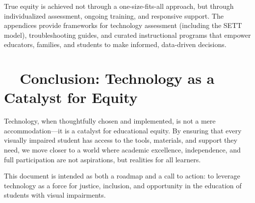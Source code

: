 True equity is achieved not through a one-size-fits-all approach, but through individualized assessment, ongoing training, and responsive support.\supercite{Presley2012, WATIAssessing} The appendices provide frameworks for technology assessment (including the SETT model\supercite{Zabala2005, Hollingshead2020}), troubleshooting guides, and curated instructional programs that empower educators, families, and students to make informed, data-driven decisions.

\section{~~Conclusion: Technology as a Catalyst for Equity}
\label{sec:intro-conclusion}

Technology, when thoughtfully chosen and implemented, is not a mere accommodation—it is a catalyst for educational equity. By ensuring that every visually impaired student has access to the tools, materials, and support they need, we move closer to a world where academic excellence, independence, and full participation are not aspirations, but realities for all learners.

\bigskip

This document is intended as both a roadmap and a call to action: to leverage technology as a force for justice, inclusion, and opportunity in the education of students with visual impairments.\supercite{Warschauer2003TechnologyAndSocialInclusion}

